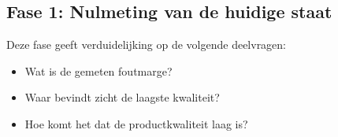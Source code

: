 
\chapter{}%
\label{ch:methodologie}



\section{Fase 1:  Nulmeting van de huidige staat}

Deze fase geeft verduidelijking op de volgende deelvragen:
\begin{itemize}
    \item Wat is de gemeten foutmarge?
    \item Waar bevindt zicht de laagste kwaliteit?
    \item Hoe komt het dat de productkwaliteit laag is?
\end{itemize}



